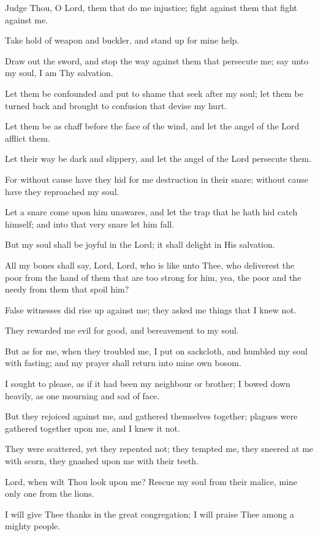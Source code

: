 Judge Thou, O Lord, them that do me injustice; fight against them that fight against me.

Take hold of weapon and buckler, and stand up for mine help.

Draw out the sword, and stop the way against them that persecute me; say unto my soul, I am Thy salvation.

Let them be confounded and put to shame that seek after my soul; let them be turned back and brought to confusion that devise my hurt.

Let them be as chaff before the face of the wind, and let the angel of the Lord afflict them.

Let their way be dark and slippery, and let the angel of the Lord persecute them.

For without cause have they hid for me destruction in their snare; without cause have they reproached my soul.

Let a snare come upon him unawares, and let the trap that he hath hid catch himself; and into that very snare let him fall.

But my soul shall be joyful in the Lord; it shall delight in His salvation.

All my bones shall say, Lord, Lord, who is like unto Thee, who deliverest the poor from the hand of them that are too strong for him, yea, the poor and the needy from them that spoil him?

False witnesses did rise up against me; they asked me things that I knew not.

They rewarded me evil for good, and bereavement to my soul.

But as for me, when they troubled me, I put on sackcloth, and humbled my soul with fasting; and my prayer shall return into mine own bosom.

I sought to please, as if it had been my neighbour or brother; I bowed down heavily, as one mourning and sad of face.

But they rejoiced against me, and gathered themselves together; plagues were gathered together upon me, and I knew it not.

They were scattered, yet they repented not; they tempted me, they sneered at me with scorn, they gnashed upon me with their teeth.

Lord, when wilt Thou look upon me? Rescue my soul from their malice, mine only one from the lions.

I will give Thee thanks in the great congregation; I will praise Thee among a mighty people.

